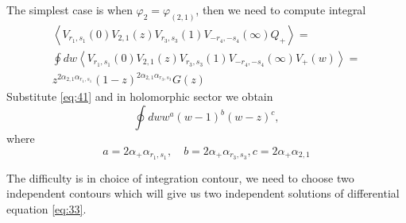 \documentclass[12pt]{article}
\begin{document}
The simplest case is when $\varphi_{2}=\varphi_{(2,1)}$, then we need to compute integral
\begin{multline}
  \label{eq:60}
  \left<
    V_{r_{1},s_{1}}(0) V_{2,1}(z) V_{r_{3},s_{3}}(1) V_{-r_{4},-s_{4}}(\infty)
    Q_{+}\right>=\\
  \oint dw \left<     V_{r_{1},s_{1}}(0) V_{2,1}(z) V_{r_{3},s_{3}}(1) V_{-r_{4},-s_{4}}(\infty)
    V_{+}(w)\right>=\\
  z^{2\alpha_{2,1}\alpha_{r_{1},s_{1}}}  (1-z)^{2\alpha_{2,1}\alpha_{r_{3},s_{3}}} G(z)
\end{multline}
Substitute \eqref{eq:41} and in holomorphic sector we obtain
\begin{equation}
  \label{eq:61}
  \oint dw w^{a}(w-1)^{b}(w-z)^{c},
\end{equation}
where
\begin{equation}
  \label{eq:62}
  a=2\alpha_{+}\alpha_{r_{1},s_{1}},\quad b=2\alpha_{+}\alpha_{r_{3},s_{3}}, c=2\alpha_{+}\alpha_{2,1}
\end{equation}

The difficulty is in choice of integration contour, we need to choose two independent contours which
will give us two independent solutions of differential equation \eqref{eq:33}. 
\end{document}
